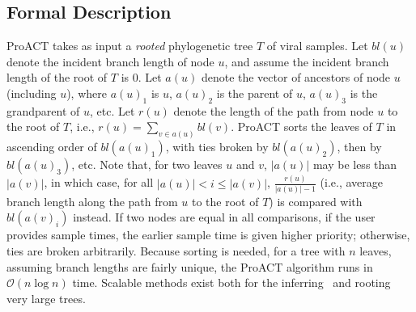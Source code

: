 \documentclass[oupdraft]{sysbio}
\newcommand{\bigO}{\mathcal{O}}
\newcommand{\PLWH}{sample\xspace}
\newcommand{\D}{D}
\newcommand{\ta}[1][A]{t'}
\newcommand{\tb}{t'}
\begin{document}
\subsection{Formal Description}
ProACT takes as input a {\em rooted} phylogenetic tree $T$ of viral samples. %
Let $bl(u)$ denote the incident branch length of node $u$,
and assume the incident branch length of the root of $T$ is 0.
Let $a(u)$ denote the vector of ancestors of node $u$ (including $u$),
where $a(u)_1$ is $u$,
$a(u)_2$ is the parent of $u$,
$a(u)_3$ is the grandparent of $u$, etc.
Let $r(u)$ denote the length of the path from node $u$ to the root of $T$,
i.e., $r(u)=\sum_{v\in a(u)}{bl(v)}$.
ProACT sorts the leaves of $T$ in ascending order of $bl(a(u)_1)$,
with ties broken by $bl(a(u)_2)$, then by $bl(a(u)_3)$, etc.
Note that, for two leaves $u$ and $v$,
$|a(u)|$ may be less than $|a(v)|$,
in which case, for all $|a(u)|<i\le|a(v)|$,
$\frac{r(u)}{|a(u)|-1}$ (i.e., average branch length along the path from $u$ to the root of $T$) is compared with $bl(a(v)_i)$ instead.
If two nodes are equal in all comparisons, if the user provides sample times, the earlier sample time is given higher priority; otherwise, ties are broken arbitrarily.
Because sorting is needed, for a tree with $n$ leaves,
assuming branch lengths are fairly unique,
the ProACT algorithm runs in $\bigO(n\log n)$ time. Scalable methods exist both for the inferring~\citep[e.g.][]{Price2010,Nguyen2015} and rooting~\citep[e.g.][]{Mai2017} very large trees.

\end{document}
